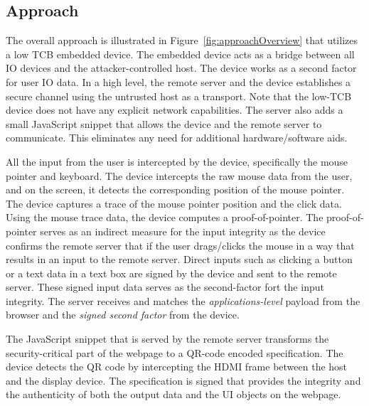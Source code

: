 \subsection{Approach}

The overall approach is illustrated in Figure~\ref{fig:approachOverview} that utilizes a low TCB embedded device. The embedded device acts as a bridge between all IO devices and the attacker-controlled host. The device works as a second factor for user IO data. In a high level, the remote server and the device establishes a secure channel using the untrusted host as a transport. Note that the low-TCB device does not have any explicit network capabilities. The server also adds a small JavaScript snippet that allows the device and the remote server to communicate. This eliminates any need for additional hardware/software aids.


All the input from the user is intercepted by the device, specifically the mouse pointer and keyboard. The device intercepts the raw mouse data from the user, and on the screen, it detects the corresponding position of the mouse pointer. The device captures a trace of the mouse pointer position and the click data. Using the mouse trace data, the device computes a proof-of-pointer. The proof-of-pointer serves as an indirect measure for the input integrity as the device confirms the remote server that if the user drags/clicks the mouse in a way that results in an input to the remote server. Direct inputs such as clicking a button or a text data in a text box are signed by the device and sent to the remote server. These signed input data serves as the second-factor fort the input integrity. The server receives and matches the \emph{applications-level} payload from the browser and the \emph{signed second factor} from the device. 


The JavaScript snippet that is served by the remote server transforms the security-critical part of the webpage to a QR-code encoded specification. The device detects the QR code by intercepting the HDMI frame between the host and the display device. The specification is signed that provides the integrity and the authenticity of both the output data and the UI objects on the webpage. 

